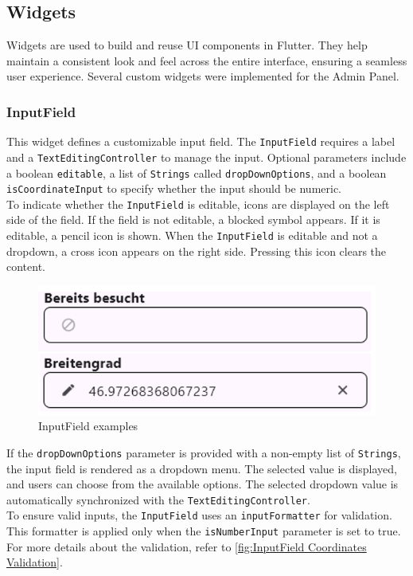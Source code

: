 \subsection{Widgets}
Widgets are used to build and reuse UI components in Flutter. They help maintain a consistent look and feel across the entire interface, ensuring a seamless user experience. Several custom widgets were implemented for the Admin Panel.

\subsubsection{InputField}
\label{fig:InputField} 
This widget defines a customizable input field. The \texttt{InputField} requires a label and a \texttt{TextEditingController} to manage the input. Optional parameters include a boolean \texttt{editable}, a list of \texttt{Strings} called \texttt{dropDownOptions}, and a boolean \texttt{isCoordinateInput} to specify whether the input should be numeric.\\

To indicate whether the \texttt{InputField} is editable, icons are displayed on the left side of the field. If the field is not editable, a blocked symbol appears. If it is editable, a pencil icon is shown. When the \texttt{InputField} is editable and not a dropdown, a cross icon appears on the right side. Pressing this icon clears the content.

\begin{figure}[H]
    \centering
    \includegraphics[width=0.4\linewidth]{images/AdminPanel/InputFieldExamples.png}
    \caption{InputField examples}
\end{figure}

If the \texttt{dropDownOptions} parameter is provided with a non-empty list of \texttt{Strings}, the input field is rendered as a dropdown menu. The selected value is displayed, and users can choose from the available options. The selected dropdown value is automatically synchronized with the \texttt{TextEditingController}. \\

To ensure valid inputs, the \texttt{InputField} uses an \texttt{inputFormatter} for validation. This formatter is applied only when the \texttt{isNumberInput} parameter is set to true. For more details about the validation, refer to \ref{fig:InputField Coordinates Validation}.


